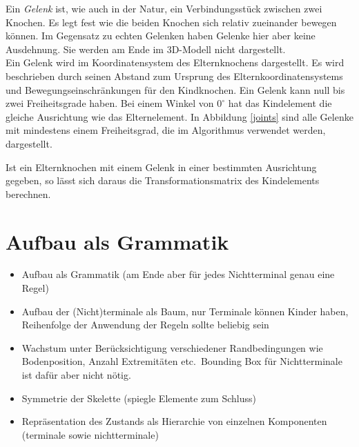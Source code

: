 Ein \emph{Gelenk} ist, wie auch in der Natur, ein Verbindungsstück zwischen zwei Knochen. Es legt fest wie die beiden Knochen sich relativ zueinander bewegen können. Im Gegensatz zu echten Gelenken haben Gelenke hier aber keine Ausdehnung. Sie werden am Ende im 3D-Modell nicht dargestellt.\\
Ein Gelenk wird im Koordinatensystem des Elternknochens dargestellt. Es wird beschrieben durch seinen Abstand zum Ursprung des Elternkoordinatensystems und Bewegungseinschränkungen für den Kindknochen. Ein Gelenk kann null bis zwei Freiheitsgrade haben. Bei einem Winkel von $0^\circ$ hat das Kindelement die gleiche Ausrichtung wie das Elternelement. In Abbildung \ref{joints} sind alle Gelenke mit mindestens einem Freiheitsgrad, die im Algorithmus verwendet werden, dargestellt.

Ist ein Elternknochen mit einem Gelenk in einer bestimmten Ausrichtung gegeben, so lässt sich daraus die Transformationsmatrix des Kindelements berechnen.


\section{Aufbau als Grammatik}
\label{section:grammar}

\begin{itemize}
  \item Aufbau als Grammatik (am Ende aber für jedes Nichtterminal genau eine Regel)
  \item Aufbau der (Nicht)terminale als Baum, nur Terminale können Kinder haben, Reihenfolge der Anwendung der Regeln sollte beliebig sein
  \item Wachstum unter Berücksichtigung verschiedener Randbedingungen wie Bodenposition, Anzahl Extremitäten etc.\ Bounding Box für Nichtterminale ist dafür aber nicht nötig.
  \item Symmetrie der Skelette (spiegle Elemente zum Schluss)
  \item Repräsentation des Zustands als Hierarchie von einzelnen Komponenten (terminale sowie nichtterminale)
 \end{itemize}
 
